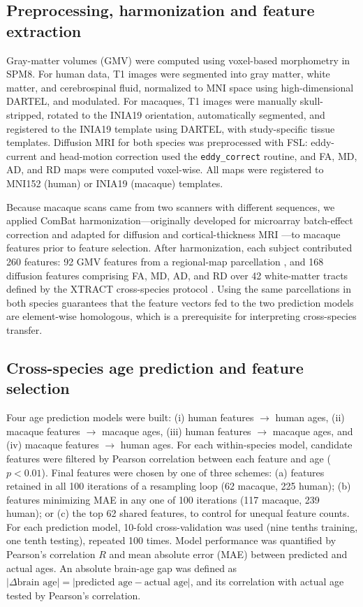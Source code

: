 \documentclass[11pt]{article}
\begin{document}
\subsection{Preprocessing, harmonization and feature extraction}

Gray-matter volumes (GMV) were computed using voxel-based morphometry in SPM8. For human data, T1 images were segmented into gray matter, white matter, and cerebrospinal fluid, normalized to MNI space using high-dimensional DARTEL, and modulated. For macaques, T1 images were manually skull-stripped, rotated to the INIA19 orientation, automatically segmented, and registered to the INIA19 template \citep{rohlfing2012inia19} using DARTEL, with study-specific tissue templates. Diffusion MRI for both species was preprocessed with FSL: eddy-current and head-motion correction used the \texttt{eddy\_correct} routine, and FA, MD, AD, and RD maps were computed voxel-wise. All maps were registered to MNI152 (human) or INIA19 (macaque) templates.

Because macaque scans came from two scanners with different sequences, we applied ComBat harmonization---originally developed for microarray batch-effect correction \citep{johnson2007adjusting} and adapted for diffusion and cortical-thickness MRI \citep{fortin2017harmonization_dti, fortin2017harmonization_thickness}---to macaque features prior to feature selection. After harmonization, each subject contributed 260 features: 92 GMV features from a regional-map parcellation \citep{bezgin2012hierarchical}, and 168 diffusion features comprising FA, MD, AD, and RD over 42 white-matter tracts defined by the XTRACT cross-species protocol \citep{warrington2020xtract}. Using the same parcellations in both species guarantees that the feature vectors fed to the two prediction models are element-wise homologous, which is a prerequisite for interpreting cross-species transfer.

\subsection{Cross-species age prediction and feature selection}

Four age prediction models were built: (i) human features $\rightarrow$ human ages, (ii) macaque features $\rightarrow$ macaque ages, (iii) human features $\rightarrow$ macaque ages, and (iv) macaque features $\rightarrow$ human ages. For each within-species model, candidate features were filtered by Pearson correlation between each feature and age ($p < 0.01$). Final features were chosen by one of three schemes: (a) features retained in all 100 iterations of a resampling loop (62 macaque, 225 human); (b) features minimizing MAE in any one of 100 iterations (117 macaque, 239 human); or (c) the top 62 shared features, to control for unequal feature counts. For each prediction model, 10-fold cross-validation was used (nine tenths training, one tenth testing), repeated 100 times. Model performance was quantified by Pearson's correlation $R$ and mean absolute error (MAE) between predicted and actual ages. An absolute brain-age gap was defined as $|\Delta\text{brain age}| = |\text{predicted age} - \text{actual age}|$, and its correlation with actual age tested by Pearson's correlation.
\end{document}
